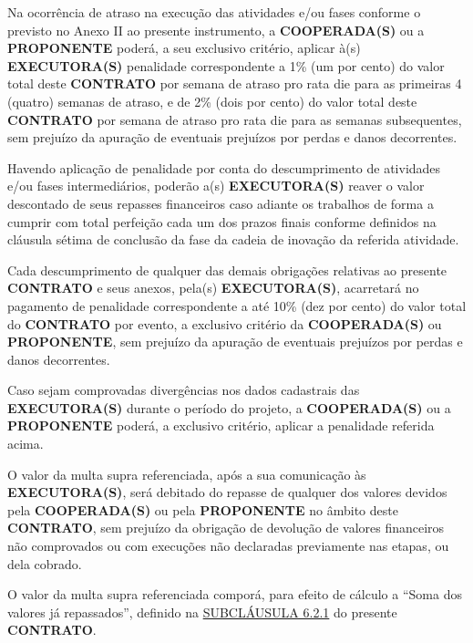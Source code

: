 

\xx Na ocorrência de atraso na execução das atividades e/ou fases conforme o previsto no Anexo II ao presente instrumento, a \textbf{COOPERADA(S)} ou a \textbf{PROPONENTE} poderá, a seu exclusivo critério, aplicar à(s) \textbf{EXECUTORA(S)} penalidade correspondente a 1\% (um por cento) do valor total deste \textbf{CONTRATO} por semana de atraso pro rata die para as primeiras 4 (quatro) semanas de atraso, e de 2\% (dois por cento) do valor total deste \textbf{CONTRATO} por semana de atraso pro rata die para as semanas subsequentes, sem prejuízo da apuração de eventuais prejuízos por perdas e danos decorrentes.

\xxx Havendo aplicação de penalidade por conta do descumprimento de atividades e/ou fases intermediários, poderão a(s) \textbf{EXECUTORA(S)} reaver o valor descontado de seus repasses financeiros caso adiante os trabalhos de forma a cumprir com total perfeição cada um dos prazos finais conforme definidos na cláusula sétima de conclusão da fase da cadeia de inovação da referida atividade.

\xx Cada descumprimento de qualquer das demais obrigações relativas ao presente \textbf{CONTRATO} e seus anexos, pela(s) \textbf{EXECUTORA(S)}, acarretará no pagamento de penalidade correspondente a até 10\% (dez por cento) do valor total do \textbf{CONTRATO} por evento, a exclusivo critério da \textbf{COOPERADA(S)} ou \textbf{PROPONENTE}, sem prejuízo da apuração de eventuais prejuízos por perdas e danos decorrentes.

\xxx Caso sejam comprovadas divergências nos dados cadastrais das \textbf{EXECUTORA(S)} durante o período do projeto, a \textbf{COOPERADA(S)} ou a \textbf{PROPONENTE} poderá, a exclusivo critério, aplicar a penalidade referida acima.

\xx O valor da multa supra referenciada, após a sua comunicação às \textbf{EXECUTORA(S)}, será debitado do repasse de qualquer dos valores devidos pela \textbf{COOPERADA(S)} ou pela \textbf{PROPONENTE} no âmbito deste \textbf{CONTRATO}, sem prejuízo da obrigação de devolução de valores financeiros não comprovados ou com execuções não declaradas previamente nas etapas, ou dela cobrado.

\xxx O valor da multa supra referenciada comporá, para efeito de cálculo a “Soma dos valores já repassados”, definido na \hyperlink{6.2.1}{SUBCLÁUSULA 6.2.1} do presente \textbf{CONTRATO}.